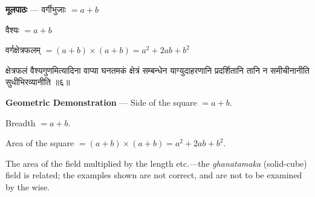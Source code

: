\documentclass[11pt,a4paper]{article}
\newcommand{\skt}[1]{{\devanagarifont\color{sktcolor} #1}}
\newenvironment{bilingual}{%
  \par\noindent
  \begin{minipage}[t]{0.47\textwidth}%
}{%
  \par\end{minipage}%
}
\newcommand{\rightcol}{%
  \par\end{minipage}%
  \hfill
  \begin{minipage}[t]{0.47\textwidth}%
}
\begin{document}
\medskip

\begin{bilingual}
\textbf{मूलपाठः} --- \skt{वर्गीभुजाः} $= a + b$

\skt{वैश्यः} $= a + b$

\skt{वर्गक्षेत्रफलम्} $= (a+b) \times (a+b) = a^2 + 2ab + b^2$

\skt{क्षेत्रफलं वैश्यगुणमित्यादिना वाप्या घनतमकं क्षेत्रं सम्बन्धेन याग्युदाहरणानि प्रदर्शितानि तानि न समीचीनानीति सुधीभिरव्यानीति} ॥६॥
\rightcol
\textbf{Geometric Demonstration} --- Side of the square $= a + b$.

Breadth $= a + b$.

Area of the square $= (a+b) \times (a+b) = a^2 + 2ab + b^2$.

The area of the field multiplied by the length etc.---the \textit{ghanatamaka} (solid-cube) field is related; the examples shown are not correct, and are not to be examined by the wise.
\end{bilingual}

\medskip
\end{document}
